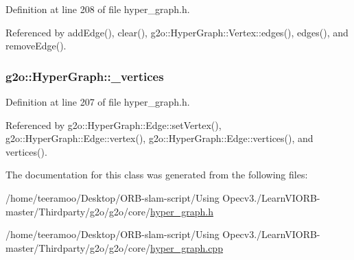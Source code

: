 Definition at line 208 of file hyper\+\_\+graph.\+h.



Referenced by add\+Edge(), clear(), g2o\+::\+Hyper\+Graph\+::\+Vertex\+::edges(), edges(), and remove\+Edge().

\subsubsection[{\texorpdfstring{\+\_\+vertices}{_vertices}}]{ g2o\+::\+Hyper\+Graph\+::\+\_\+vertices\hspace{0.3cm}{\ttfamily [protected]}}\hypertarget{classg2o_1_1HyperGraph_a83132c77c8d0896581d168cbc72f673a}{}\label{classg2o_1_1HyperGraph_a83132c77c8d0896581d168cbc72f673a}


Definition at line 207 of file hyper\+\_\+graph.\+h.



Referenced by g2o\+::\+Hyper\+Graph\+::\+Edge\+::set\+Vertex(), g2o\+::\+Hyper\+Graph\+::\+Edge\+::vertex(), g2o\+::\+Hyper\+Graph\+::\+Edge\+::vertices(), and vertices().



The documentation for this class was generated from the following files\+:\begin{DoxyCompactItemize}
\item 
/home/teeramoo/\+Desktop/\+O\+R\+B-\/slam-\/script/\+Using Opecv3./\+Learn\+V\+I\+O\+R\+B-\/master/\+Thirdparty/g2o/g2o/core/\hyperlink{hyper__graph_8h}{hyper\+\_\+graph.\+h}\item 
/home/teeramoo/\+Desktop/\+O\+R\+B-\/slam-\/script/\+Using Opecv3./\+Learn\+V\+I\+O\+R\+B-\/master/\+Thirdparty/g2o/g2o/core/\hyperlink{hyper__graph_8cpp}{hyper\+\_\+graph.\+cpp}\end{DoxyCompactItemize}
